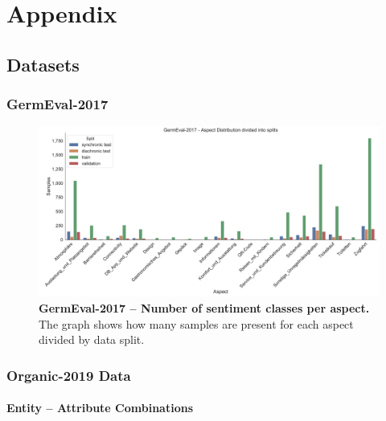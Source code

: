 \chapter{Appendix}

\section{Datasets}

\subsection{GermEval-2017}
\begin{figure}[H]
    \centering
    \includegraphics[width=\textwidth]{figures/08_appendix/08_germevalAspects}
    \caption{\textbf{GermEval-2017 -- Number of sentiment classes per aspect.} The graph shows how many samples are present for each aspect divided by data split.}
    \label{fig:08_germEvalStatistics}
\end{figure}

\subsection{Organic-2019 Data}

\subsubsection*{Entity -- Attribute Combinations}

